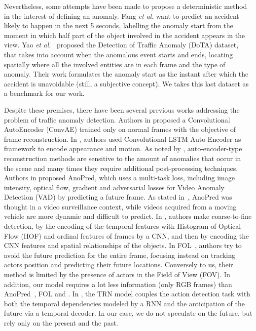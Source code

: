 Nevertheless, some attempts have been made to propose a deterministic method in the interest of defining an anomaly.
Fang \emph{et al.} \cite{fang2019dada} want to predict an accident likely to happen in the next 5 seconds, labelling the anomaly start from the moment in which half part of the object involved in the accident appears in the view.
Yao \emph{et al.}~\cite{9712446} proposed the Detection of Traffic Anomaly (DoTA) dataset, that takes into account when the anomalous event starts and ends, locating spatially where all the involved entities are in each frame and the type of anomaly.
Their work formulates the anomaly start as the instant after which the accident is unavoidable (still, a subjective concept).
We takes this last dataset as a benchmark for our work.

Despite these premises, there have been several previous works addressing the problem of traffic anomaly detection.
Authors in \cite{hasan2016learning} proposed a Convolutional AutoEncoder (ConvAE) trained only on normal frames with the objective of frame reconstruction.
In \cite{luo2017remembering, wang2018abnormal}, authors used Convolutional LSTM Auto-Encoder as framework to encode appearance and motion.
As noted by \cite{ramachandra2020survey}, auto-encoder-type reconstruction methods are sensitive to the amount of anomalies that occur in the scene and many times they require additional post-processing techniques.
Authors in \cite{liu2018future} proposed AnoPred, which uses a multi-task loss, including image intensity, optical flow, gradient and adversarial losses for Video Anomaly Detection (VAD) by predicting a future frame.
As stated in~\cite{9712446}, AnoPred was thought in a video surveillance context, while videos acquired from a moving vehicle are more dynamic and difficult to predict.
In \cite{zhou_spatio-temporal_2022}, authors make coarse-to-fine detection, by the encoding of the temporal features with Histogram of Optical Flow (HOF) \cite{wang2013action} and ordinal features of frames by a CNN, and then by encoding the CNN features and spatial relationships of the objects.
In FOL~\cite{9712446}, authors try to avoid the future prediction for the entire frame, focusing instead on tracking actors position and predicting their future locations.
Conversely to us, their method is limited by the presence of actors in the Field of View (FOV).
In addition, our model requires a lot less information (only RGB frames) than AnoPred~\cite{liu2018future}, FOL \cite{9712446} and \cite{zhou_spatio-temporal_2022}.
In \cite{xu2019temporal}, the TRN model couples the action detection task with both the temporal dependencies modeled by a RNN and the anticipation of the future via a temporal decoder.
In our case, we do not speculate on the future, but rely only on the present and the past.

